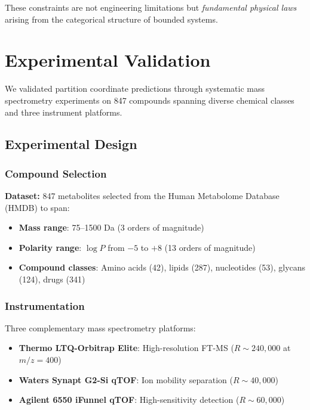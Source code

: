These constraints are not engineering limitations but \emph{fundamental physical laws} arising from the categorical structure of bounded systems.

\section{Experimental Validation}
\label{sec:validation}

We validated partition coordinate predictions through systematic mass spectrometry experiments on 847 compounds spanning diverse chemical classes and three instrument platforms.

\subsection{Experimental Design}

\subsubsection{Compound Selection}

\textbf{Dataset:} 847 metabolites selected from the Human Metabolome Database (HMDB) to span:
\begin{itemize}
    \item \textbf{Mass range}: 75–1500 Da (3 orders of magnitude)
    \item \textbf{Polarity range}: $\log P$ from $-5$ to $+8$ (13 orders of magnitude)
    \item \textbf{Compound classes}: Amino acids (42), lipids (287), nucleotides (53), glycans (124), drugs (341)
\end{itemize}

\subsubsection{Instrumentation}

Three complementary mass spectrometry platforms:
\begin{itemize}
    \item \textbf{Thermo LTQ-Orbitrap Elite}: High-resolution FT-MS ($R \sim 240{,}000$ at $m/z = 400$)
    \item \textbf{Waters Synapt G2-Si qTOF}: Ion mobility separation ($R \sim 40{,}000$)
    \item \textbf{Agilent 6550 iFunnel qTOF}: High-sensitivity detection ($R \sim 60{,}000$)
\end{itemize}

